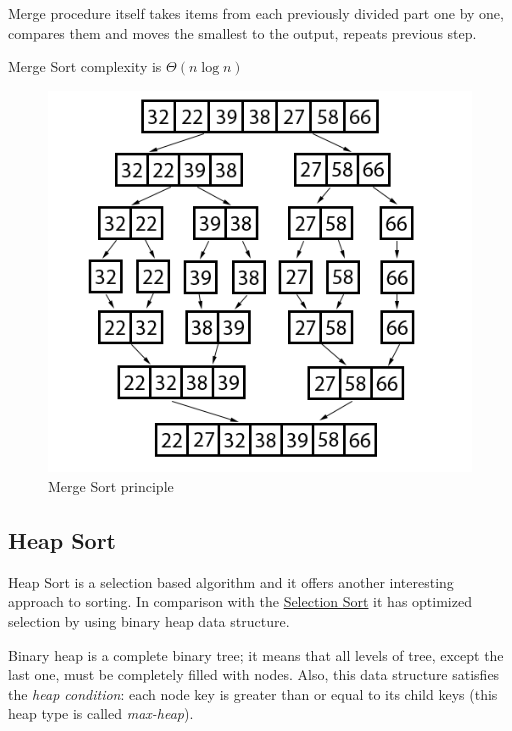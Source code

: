 \documentclass[
  field=inf,
  biblatex,
  language=english,
  glossaries,
  theorems=false,
  index
]{kidiplom}
\begin{document}
Merge procedure itself takes items from each previously divided part one by one, compares them and moves the smallest to the output, repeats previous step.

Merge Sort complexity is $\Theta(n \log n)$

\begin{figure}[H]
\begin{center}
	
	\includegraphics[scale=2.5]{img/Mergesort.png}
	\caption{Merge Sort principle}\label{fig:insert}
\end{center}
\end{figure}

\subsection{Heap Sort}

Heap Sort is a selection based algorithm and it offers another interesting approach to sorting. In comparison with the \hyperref[sec:selection]{Selection Sort} it has optimized selection by using binary heap data structure. 

Binary heap is a complete binary tree; it means that all levels of tree, except the last one, must be completely filled with nodes. Also, this data structure satisfies the \textit{heap condition}: each node key is greater than or equal to its child keys (this heap type is called \textit{max-heap}).
\end{document}
